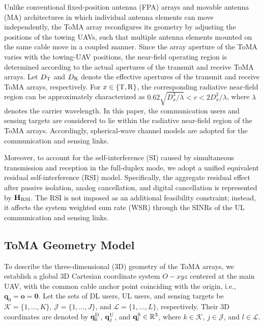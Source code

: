 \documentclass[letterpaper,journal]{IEEEtran}
\begin{document}
Unlike conventional fixed-position antenna (FPA) arrays and movable antenna (MA) architectures in which individual antenna elements can move independently, the ToMA array reconfigures its geometry by adjusting the positions of the towing UAVs, such that multiple antenna elements mounted on the same cable move in a coupled manner. Since the array aperture of the ToMA varies with the towing-UAV positions, the near-field operating region is determined according to the actual apertures of the transmit and receive ToMA arrays. Let $D_{\rm T}$ and $D_{\rm R}$ denote the effective apertures of the transmit and receive ToMA arrays, respectively. For $x\in\{{\rm T},{\rm R}\}$, the corresponding radiative near-field region can be approximately characterized as $0.62\sqrt{D_x^3/\lambda}<r<2D_x^2/\lambda$, where $\lambda$ denotes the carrier wavelength. In this paper, the communication users and sensing targets are considered to lie within the radiative near-field region of the ToMA arrays. Accordingly, spherical-wave channel models are adopted for the communication and sensing links.

Moreover, to account for the self-interference (SI) caused by simultaneous transmission and reception in the full-duplex mode, we adopt a unified equivalent residual self-interference (RSI) model. Specifically, the aggregate residual effect after passive isolation, analog cancellation, and digital cancellation is represented by $\mathbf H_{\rm RSI}$. The RSI is not imposed as an additional feasibility constraint; instead, it affects the system weighted sum rate (WSR) through the SINRs of the UL communication and sensing links.

\subsection{ToMA Geometry Model}
\label{subsec:toma_geometry}

To describe the three-dimensional (3D) geometry of the ToMA arrays, we establish a global 3D Cartesian coordinate system $O\!-\!xyz$ centered at the main UAV, with the common cable anchor point coinciding with the origin, i.e., $\mathbf q_0=\mathbf o=\mathbf 0$. Let the sets of DL users, UL users, and sensing targets be $\mathcal K=\{1,\ldots,K\}$, $\mathcal J=\{1,\ldots,J\}$, and $\mathcal L=\{1,\ldots,L\}$, respectively. Their 3D coordinates are denoted by $\mathbf q_k^{\rm D}$, $\mathbf q_j^{\rm U}$, and $\mathbf q_l^{\rm S}\in\mathbb R^3$, where $k\in\mathcal K$, $j\in\mathcal J$, and $l\in\mathcal L$.
\end{document}

